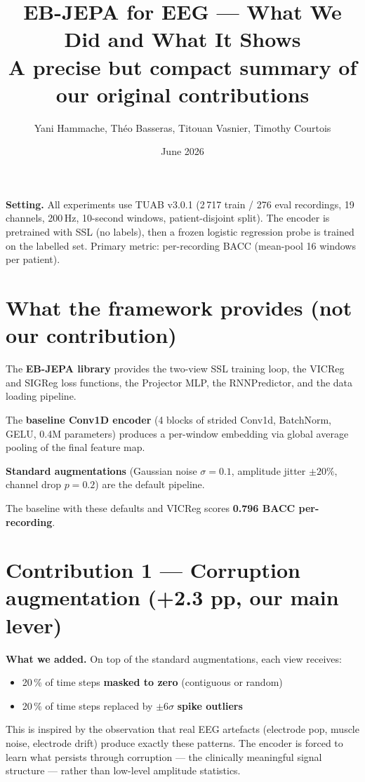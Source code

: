 \documentclass[11pt,a4paper]{article}
\title{\textbf{EB-JEPA for EEG — What We Did and What It Shows}\\
\large A precise but compact summary of our original contributions}
\author{Yani Hammache, Théo Basseras, Titouan Vasnier, Timothy Courtois}
\date{June 2026}
\begin{document}
\maketitle

\noindent\textbf{Setting.}
All experiments use TUAB v3.0.1 (2\,717 train / 276 eval recordings,
19 channels, 200\,Hz, 10-second windows, patient-disjoint split).
The encoder is pretrained with SSL (no labels), then a frozen logistic
regression probe is trained on the labelled set.
Primary metric: per-recording BACC (mean-pool 16 windows per patient).

\bigskip

\section{What the framework provides (not our contribution)}

The \textbf{EB-JEPA library} provides the two-view SSL training loop,
the VICReg and SIGReg loss functions, the Projector MLP, the RNNPredictor,
and the data loading pipeline.

The \textbf{baseline Conv1D encoder} (4 blocks of strided Conv1d, BatchNorm,
GELU, 0.4M parameters) produces a per-window embedding via global average pooling
of the final feature map.

\textbf{Standard augmentations} (Gaussian noise $\sigma{=}0.1$, amplitude
jitter $\pm20\%$, channel drop $p{=}0.2$) are the default pipeline.

The baseline with these defaults and VICReg scores \textbf{0.796 BACC per-recording}.

\bigskip

\section{Contribution 1 — Corruption augmentation (+2.3 pp, our main lever)}

\textbf{What we added.}
On top of the standard augmentations, each view receives:
\begin{itemize}[noitemsep]
  \item 20\,\% of time steps \textbf{masked to zero} (contiguous or random)
  \item 20\,\% of time steps replaced by $\pm 6\sigma$ \textbf{spike outliers}
\end{itemize}
This is inspired by the observation that real EEG artefacts (electrode pop,
muscle noise, electrode drift) produce exactly these patterns.  The encoder
is forced to learn what persists through corruption — the clinically meaningful
signal structure — rather than low-level amplitude statistics.
\end{document}
